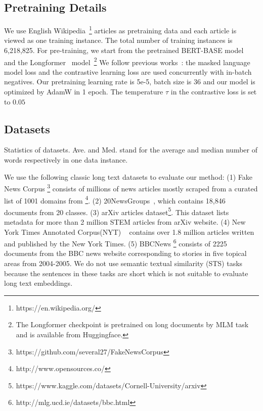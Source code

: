 \documentclass[11pt]{article}
\begin{document}
\subsection{Pretraining Details}
We use English Wikipedia~\footnote{https://en.wikipedia.org/} articles as pretraining data and each article is viewed as one training instance. 
The total number of training instances is 6,218,825. For pre-training, we start from the pretrained BERT-BASE model~\cite{Devlin2019BERTPO} and the Longformer~\cite{Beltagy2020LongformerTL} model~\footnote{The Longformer checkpoint is pretrained on long documents by MLM task and is available from Huggingface.} 
We follow previous works~\cite{Gao2021SimCSESC, Li2022UCTopicUC}: the masked language model loss and the contrastive learning loss are used concurrently with in-batch negatives. 
Our pretraining learning rate is 5e-5, batch size is 36 and our model is optimized by AdamW in 1 epoch. 
The temperature $\tau$ in the contrastive loss is set to $0.05$

\subsection{Datasets}
\begin{table}
    
    \caption{Statistics of datasets. Ave. and Med. stand for the average and median number of words respectively in one data instance.}
    \label{dataset}
\end{table}
We use the following classic long text datasets to evaluate our method:
(1) Fake News Corpus \footnote{https://github.com/several27/FakeNewsCorpus} consists of millions of news articles mostly scraped from a curated list of 1001 domains from \footnote{http://www.opensources.co/}.
(2) 20NewsGroups~\cite{Lang1995NewsWeederLT}, which contains 18,846 documents from 20 classes.
(3) arXiv articles dataset\footnote{https://www.kaggle.com/datasets/Cornell-University/arxiv}. This dataset lists metadata for more than 2 million STEM articles from arXiv website.
(4) New York Times Annotated Corpus(NYT) ~\cite{sandhaus2008new} contains over 1.8 million articles written and published by the New York Times.
(5) BBCNews \footnote{http://mlg.ucd.ie/datasets/bbc.html} consists of 2225 documents from the BBC news website corresponding to stories in five topical areas from 2004-2005.
We do not use semantic textual similarity (STS) tasks~\cite{Agirre2012SemEval2012T6} because the sentences in these tasks are short which is not suitable to evaluate long text embeddings.
\end{document}

